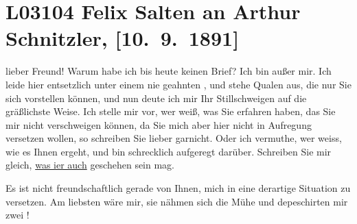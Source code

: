 

\section[Felix Salten an Arthur Schnitzler, {[}10. 9. 1891{]}]{L03104 Felix Salten an Arthur Schnitzler, {[}10. 9. 1891{]}}
\nopagebreak{}
\rehead{ }\normalsize\beginnumbering{}
\toendnotes[C]{\smallbreak\pagebreak[2]}
\toendnotes[C]{\smallbreak}
\toendnotes[C]{\smallbreak}
\pstart
           \noindent{}{\pb}lieber Freund! Warum habe ich bis heute keinen Brief? Ich bin außer mir. Ich leide hier entsetzlich unter einem
               nie geahnten \label{K_L03104-1v}\label{K_L03104-1}, und stehe Qualen aus, die nur Sie sich vorstellen können, und nun deute ich
               mir Ihr Stillschweigen auf die gräßlichste Weise. Ich stelle mir vor, wer weiß, was
               Sie erfahren haben,  das Sie mir nicht verschweigen
               können, da Sie mich aber hier nicht in Aufregung
               versetzen wollen, so schreiben Sie lieber garnicht. Oder ich vermuthe, wer weiss, wie
               es Ihnen  ergeht, und bin schrecklich aufgeregt
               darüber. Schreiben Sie mir gleich, \uline{was i{\geminationm}er auch} geschehen sein mag.\pend
           
\pstart
           Es ist nicht freundschaftlich gerade von {\pb}Ihnen, mich in eine
               derartige Situation zu versetzen. Am liebsten wäre mir, sie nähmen sich die Mühe und
               depeschirten mir zwei \label{K_L03104-2v}\label{K_L03104-2}!\pend
           
